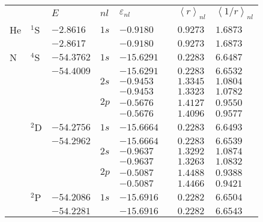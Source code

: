 \begin{table}
\begin{center}
\begin{tabular}{
>{\centering\arraybackslash}p{}
>{\centering\arraybackslash}p{}
>{\raggedleft\arraybackslash}p{}
>{\centering\arraybackslash}p{}
>{\raggedleft\arraybackslash}p{}
>{\raggedleft\arraybackslash}p{}
>{\centering\arraybackslash}p{}
>{\centering\arraybackslash}p{}}
\rowcolor{mydarkgray} 
   & & $E$ & $nl$ & $\varepsilon_{nl}$ && $\left<r\right>_{nl}$ 
   & $\left<1/r\right>_{nl}$ \\
He & $^1$S & $-2.8616$   & $1s$ & $-0.9180$  && $0.9273$ & $1.6873$ \\
\rowcolor{mygray} 
   &       & $-2.8617$   &      & $-0.9180$  && $0.9273$ & $1.6873$ \\
N  & $^4$S & $-54.3762$  & $1s$ & $-15.6291$ && $0.2283$ & $6.6487$ \\
\rowcolor{mygray} 
   &       & $-54.4009$  &      & $-15.6291$ && $0.2283$ & $6.6532$ \\
   &       &             & $2s$ & $-0.9453$  && $1.3345$ & $1.0804$ \\
   \rowcolor{mygray} 
   &       &             &      & $-0.9453$  && $1.3323$ & $1.0782$ \\
   &       &             & $2p$ & $-0.5676$  && $1.4127$ & $0.9550$ \\
   \rowcolor{mygray} 
   &       &             &      & $-0.5676$  && $1.4096$ & $0.9577$ \\
   & $^2$D & $-54.2756$  & $1s$ & $-15.6664$ && $0.2283$ & $6.6493$ \\
   \rowcolor{mygray} 
   &       & $-54.2962$  &      & $-15.6664$ && $0.2283$ & $6.6539$ \\
   &       &             & $2s$ & $-0.9637$  && $1.3292$ & $1.0874$ \\
   \rowcolor{mygray} 
   &       &             &      & $-0.9637$  && $1.3263$ & $1.0832$ \\
   &       &             & $2p$ & $-0.5087$  && $1.4488$ & $0.9388$ \\
   \rowcolor{mygray} 
   &       &             &      & $-0.5087$  && $1.4466$ & $0.9421$ \\
   & $^2$P & $-54.2086$  & $1s$ & $-15.6916$ && $0.2282$ & $6.6504$ \\
   \rowcolor{mygray} 
   &       & $-54.2281$  &      & $-15.6916$ && $0.2282$ & $6.6543$ \\

\end{tabular}
\end{center}
\end{table}
